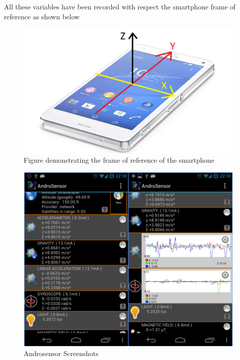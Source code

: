 All these variables have been recorded with respect the smartphone frame of reference as shown below
\begin{figure}[!ht] 
\captionsetup{width=\linewidth, font=small}  
\includegraphics[width=\linewidth]{figures/phone.jpg}
\caption{Figure demonstrating the frame of reference of the smartphone}
\label{fig:phone}
\end{figure}


\begin{figure}[!ht] 
\captionsetup{width=\linewidth, font=small}  
\includegraphics[width=\linewidth]{figures/as.png}
\caption{Androsensor Screenshots}
\label{fig:as}
\end{figure}







